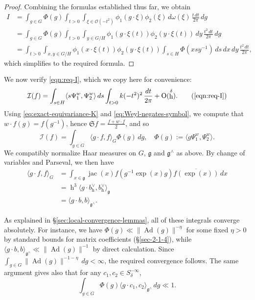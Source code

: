 \documentclass[reqno,10pt]{amsart}
\theoremstyle{plain} %
\theoremstyle{definition}
\theoremstyle{plain} %
\theoremstyle{remark}
\theoremstyle{itplain} %
\theoremstyle{remark} %
\numberwithin{equation}{section}
\DeclareMathOperator{\Ad}{Ad}
\def\O{\operatorname{O}}
\DeclareMathOperator{\h}{h}
\DeclareMathOperator{\jac}{jac}
\begin{document}
\begin{proof}
  Combining the formulas established thus far, we obtain
  \begin{align*}
    I
    &=
      \int_{g \in G}
      \Phi(g)
      \int_{t > 0}
      \int_{\xi \in \mathcal{O}(-t^2)}
      \phi_1(g \cdot \xi) \phi_2(\xi)
      \, d \omega (\xi )
      \, \frac{t \, d t}{2 \pi } \, d g
    \\
    &=
      \int_{g \in G}
      \Phi(g)
      \int_{t > 0}
      \int_{y \in G/H}
      \phi_1(g  \cdot \xi(t)) \phi_2(y \cdot \xi(t))
      \, d y
      \, \frac{t^2 \, d t}{2 \pi } \, d g
    \\
    &=
      \int_{t > 0}
      \int_{x,y \in G/H}
      \phi_1(x \cdot \xi(t)) \phi_2(y \cdot \xi(t))
      \int_{s \in H}
      \Phi(x s y^{-1}) \, d s \, d x \, d y
      \, \frac{t^2 \, d t}{2 \pi },
  \end{align*}
  which simplifies to the required formula.
\end{proof}

We now verify \eqref{eqn:req-I}, which we copy here for convenience:
\begin{equation}
  \mathcal{I}(f)
  = \int_{s \in H} \langle s \Psi_1^w, \Psi_2^w
  \rangle \,d s 
  \int_{t > 0}
  k(-t^2)^2 \, \frac{d t}{2 \pi}
  + \O(\h^\delta).
  \tag{\ref{eqn:req-I}}
\end{equation}
Using \eqref{eq:exact-equivariance-K} and \eqref{eq:Weyl-negates-symbol}, we compute that $w \cdot f(g) = f(g^{-1})$, hence $\mathfrak{S} f = \frac{f + w \cdot f}{2}$, and so
\begin{equation}\label{eq:I-f-after-simpl}
  \mathcal{I}(f)
  =
  \int_{g \in G}
  \langle g \cdot f, f \rangle_{G}
  \Phi(g) \,d g ,
  \quad 
  \Phi(g) := \langle g \Psi_1^w, \Psi_2^w \rangle.
\end{equation}
We compatibly normalize Haar measures on $G$, $\mathfrak{g}$ and $\mathfrak{g}^\wedge$ as above.  By change of variables and Parseval, we then have
\begin{align*}
  \langle g \cdot f, f \rangle_G
  &=
    \int_{x \in \mathfrak{g}}
    \jac(x)
    f(g^{-1} \exp(x) g ) \overline{f(\exp(x))}
    \, d x
  \\
  &=
    \h^3
    \langle g \cdot b_{\h}^\vee, b_{\h}^\vee
    \rangle_{\mathfrak{g}}
  \\
  &= \langle g \cdot b, b \rangle_{\mathfrak{g}^\wedge}.
\end{align*}

As explained in \S\ref{sec:local-convergence-lemmas}, all of these integrals converge absolutely.  For instance, we have $\Phi(g) \ll \|\Ad(g)\|^{-\eta}$ for some fixed $\eta > 0$ by standard bounds for matrix coefficients (\S\ref{sec-2-1-4}), while $\langle g \cdot b, b \rangle_{\mathfrak{g}^\wedge} \ll \|\Ad(g)\|^{-1}$ by direct calculation.  Since $\int_{g \in G} \|\Ad(g)\|^{-1-\eta} \,d g  < \infty$, the required convergence follows.  The same argument gives also that for any $c_1, c_2 \in S^{-\infty}_{\delta}$,
\begin{equation}\label{eqn:a-priori-g-c1-c2}
  \int_{g \in G} \Phi(g)
  \langle g \cdot c_1, c_2 \rangle_{\mathfrak{g}^\wedge}  \,d g 
  \ll 1.
\end{equation}
\end{document}

